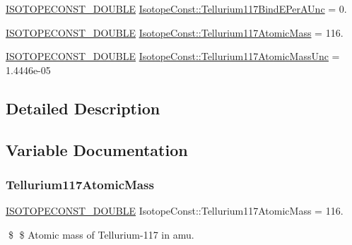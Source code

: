 \begin{DoxyCompactItemize}
\mbox{\hyperlink{group___isotope_const-_macros_ga8f45a7272ce02c0b4c65c44636ed719a}{I\+S\+O\+T\+O\+P\+E\+C\+O\+N\+S\+T\+\_\+\+D\+O\+U\+B\+LE}} \mbox{\hyperlink{group___isotope_const-_tellurium-_te117_ga10a074706695adb9d8a2a983bda827dd}{Isotope\+Const\+::\+Tellurium117\+Bind\+E\+Per\+A\+Unc}} = 0.
\item 
\mbox{\hyperlink{group___isotope_const-_macros_ga8f45a7272ce02c0b4c65c44636ed719a}{I\+S\+O\+T\+O\+P\+E\+C\+O\+N\+S\+T\+\_\+\+D\+O\+U\+B\+LE}} \mbox{\hyperlink{group___isotope_const-_tellurium-_te117_ga0f44390377086c1eb30e84091dcccf0a}{Isotope\+Const\+::\+Tellurium117\+Atomic\+Mass}} = 116.
\item 
\mbox{\hyperlink{group___isotope_const-_macros_ga8f45a7272ce02c0b4c65c44636ed719a}{I\+S\+O\+T\+O\+P\+E\+C\+O\+N\+S\+T\+\_\+\+D\+O\+U\+B\+LE}} \mbox{\hyperlink{group___isotope_const-_tellurium-_te117_ga036a2a21da4f068de49c7afc35a4091f}{Isotope\+Const\+::\+Tellurium117\+Atomic\+Mass\+Unc}} = 1.\+4446e-\/05
\end{DoxyCompactItemize}


\subsection{Detailed Description}


\subsection{Variable Documentation}
\mbox{\label{group___isotope_const-_tellurium-_te117_ga0f44390377086c1eb30e84091dcccf0a}} 
\subsubsection{\texorpdfstring{Tellurium117\+Atomic\+Mass}{Tellurium117AtomicMass}}
{\footnotesize\ttfamily \mbox{\hyperlink{group___isotope_const-_macros_ga8f45a7272ce02c0b4c65c44636ed719a}{I\+S\+O\+T\+O\+P\+E\+C\+O\+N\+S\+T\+\_\+\+D\+O\+U\+B\+LE}} Isotope\+Const\+::\+Tellurium117\+Atomic\+Mass = 116.}

\$ \$ Atomic mass of Tellurium-\/117 in amu. \mbox{\label{group___isotope_const-_tellurium-_te117_ga036a2a21da4f068de49c7afc35a4091f}} 
